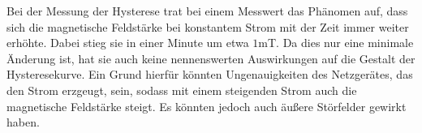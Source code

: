 Bei der Messung der Hysterese trat bei einem Messwert das Phänomen auf, dass sich
die magnetische Feldstärke bei konstantem Strom mit der Zeit immer weiter erhöhte.
Dabei stieg sie in einer Minute um etwa $1$mT. Da dies nur eine minimale Änderung
ist, hat sie auch keine nennenswerten Auswirkungen auf die Gestalt der Hysteresekurve.
Ein Grund hierfür könnten Ungenauigkeiten des Netzgerätes, das den Strom erzgeugt, sein,
sodass mit einem steigenden Strom auch die magnetische Feldstärke steigt. Es
könnten jedoch auch äußere Störfelder gewirkt haben.
